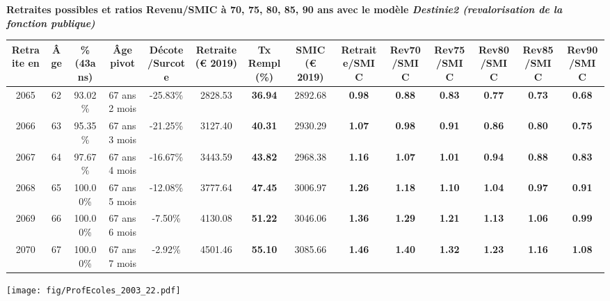  \vspace{0.1cm} 
{\bf \noindent Retraites possibles et ratios Revenu/SMIC à 70, 75, 80, 85, 90 ans avec le modèle \emph{Destinie2 (revalorisation de la fonction publique)}}  
 
\begin{adjustbox}{max width=\textwidth} 
\begin{tabular}[htb]{|c|c||c|c|c||c|c||c||c|c|c|c|c|c|} 
\hline 
 Retraite en &  Âge &  \%(43ans) &  Âge pivot &  Décote/Surcote &  Retraite (\euro{} 2019) &  Tx Rempl(\%) &  SMIC (\euro{} 2019) &  Retraite/SMIC &  Rev70/SMIC &  Rev75/SMIC &  Rev80/SMIC &  Rev85/SMIC &  Rev90/SMIC \\ 
\hline \hline 
 2065 &  62 &  93.02\% &  67 ans 2 mois &  -25.83\% &  2828.53 &  {\bf 36.94} &  2892.68 &  {\bf {\color{red} 0.98}} &  {\bf {\color{red} 0.88}} &  {\bf {\color{red} 0.83}} &  {\bf {\color{red} 0.77}} &  {\bf {\color{red} 0.73}} &  {\bf {\color{red} 0.68}} \\ 
\hline 
 2066 &  63 &  95.35\% &  67 ans 3 mois &  -21.25\% &  3127.40 &  {\bf 40.31} &  2930.29 &  {\bf 1.07} &  {\bf {\color{red} 0.98}} &  {\bf {\color{red} 0.91}} &  {\bf {\color{red} 0.86}} &  {\bf {\color{red} 0.80}} &  {\bf {\color{red} 0.75}} \\ 
\hline 
 2067 &  64 &  97.67\% &  67 ans 4 mois &  -16.67\% &  3443.59 &  {\bf 43.82} &  2968.38 &  {\bf 1.16} &  {\bf 1.07} &  {\bf 1.01} &  {\bf {\color{red} 0.94}} &  {\bf {\color{red} 0.88}} &  {\bf {\color{red} 0.83}} \\ 
\hline 
 2068 &  65 &  100.00\% &  67 ans 5 mois &  -12.08\% &  3777.64 &  {\bf 47.45} &  3006.97 &  {\bf 1.26} &  {\bf 1.18} &  {\bf 1.10} &  {\bf 1.04} &  {\bf {\color{red} 0.97}} &  {\bf {\color{red} 0.91}} \\ 
\hline 
 2069 &  66 &  100.00\% &  67 ans 6 mois &  -7.50\% &  4130.08 &  {\bf 51.22} &  3046.06 &  {\bf 1.36} &  {\bf 1.29} &  {\bf 1.21} &  {\bf 1.13} &  {\bf 1.06} &  {\bf {\color{red} 0.99}} \\ 
\hline 
 2070 &  67 &  100.00\% &  67 ans 7 mois &  -2.92\% &  4501.46 &  {\bf 55.10} &  3085.66 &  {\bf 1.46} &  {\bf 1.40} &  {\bf 1.32} &  {\bf 1.23} &  {\bf 1.16} &  {\bf 1.08} \\ 
\hline 
\hline 
\end{tabular} 
\end{adjustbox} 
 
 \vspace{0.1cm} 

 \begin{center}\texttt{[image: fig/ProfEcoles\_2003\_22.pdf]}\end{center} \label{fig/ProfEcoles_2003_22.pdf} 

